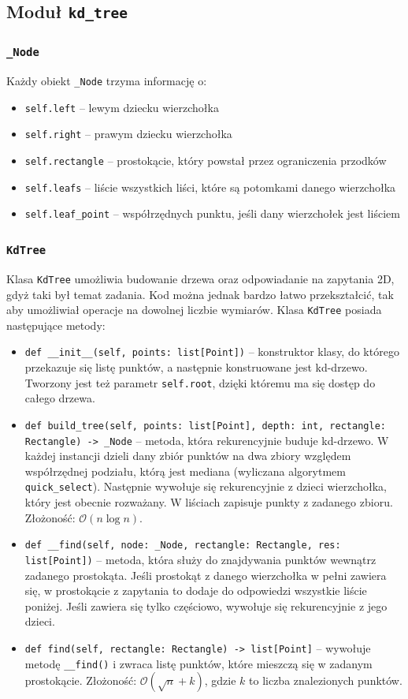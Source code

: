 \documentclass[12pt]{scrartcl}
\newcommand{\sO}{\mathcal O}
\begin{document}
\subsection{Moduł \texttt{kd\_tree}}

\subsubsection{\texttt{\_Node}}
Każdy obiekt \texttt{\_Node} trzyma informację o:
\begin{itemize}
    \item \texttt{self.left} -- lewym dziecku wierzchołka
    \item \texttt{self.right} -- prawym dziecku wierzchołka
    \item \texttt{self.rectangle} -- prostokącie, który powstał przez ograniczenia przodków
    \item \texttt{self.leafs} -- liście wszystkich liści, które są potomkami danego wierzchołka
    \item \texttt{self.leaf\_point} -- współrzędnych punktu, jeśli dany wierzchołek jest liściem
\end{itemize}

\subsubsection{\texttt{KdTree}}
Klasa \texttt{KdTree} umożliwia budowanie drzewa oraz odpowiadanie na zapytania 2D, gdyż taki był temat zadania. Kod można jednak bardzo łatwo przekształcić, tak aby umożliwiał operacje na dowolnej liczbie wymiarów. Klasa \texttt{KdTree} posiada następujące metody:
\begin{itemize}
    \item \texttt{def \_\_init\_\_(self, points: list[Point])} -- konstruktor klasy, do którego przekazuje się listę punktów, a następnie konstruowane jest kd-drzewo. Tworzony jest też parametr \texttt{self.root}, dzięki któremu ma się dostęp do całego drzewa.
    \item \texttt{def build\_tree(self, points: list[Point], depth: int, rectangle: Rectangle) -> \_Node} -- metoda, która rekurencyjnie buduje kd-drzewo. W każdej instancji dzieli dany zbiór punktów na dwa zbiory względem współrzędnej podziału, którą jest mediana (wyliczana algorytmem \texttt{quick\_select}). Następnie wywołuje się rekurencyjnie z dzieci wierzchołka, który jest obecnie rozważany. W liściach zapisuje punkty z zadanego zbioru.
    Złożoność: $\sO(n \log n)$.
    \item \texttt{def \_\_find(self, node: \_Node, rectangle: Rectangle, res: list[Point])} -- metoda, która służy do znajdywania punktów wewnątrz zadanego prostokąta. Jeśli prostokąt z danego wierzchołka w pełni zawiera się, w prostokącie z zapytania to dodaje do odpowiedzi wszystkie liście poniżej. Jeśli zawiera się tylko częściowo, wywołuje się rekurencyjnie z jego dzieci.
    \item \texttt{def find(self, rectangle: Rectangle) -> list[Point]} -- wywołuje metodę \texttt{\_\_find()} i zwraca listę punktów, które mieszczą się w zadanym prostokącie.
    Złożoność: $\sO(\sqrt n + k)$, gdzie $k$ to liczba znalezionych punktów.
\end{itemize}
\end{document}
